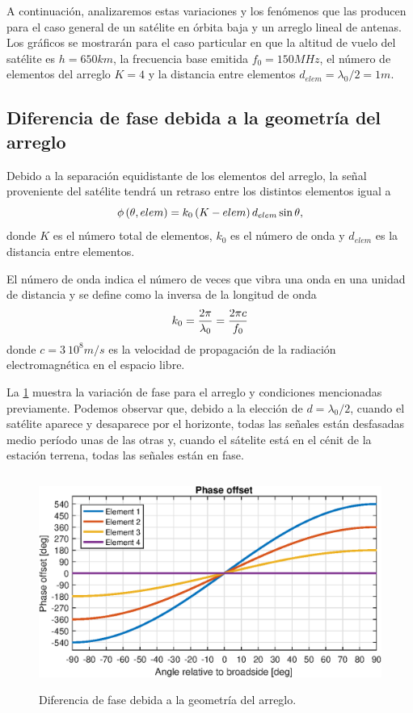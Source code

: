 \documentclass{article}
\newenvironment{standalone}{\begin{preview}}{\end{preview}}
\begin{document}
\begin{standalone}
  A continuación, analizaremos estas variaciones y los fenómenos que las producen para el caso general de un satélite en órbita baja y un arreglo lineal de antenas. Los gráficos se mostrarán para el caso particular en que la altitud de vuelo del satélite es $h = 650km$, la frecuencia base emitida $f_0 = 150MHz$, el número de elementos del arreglo $K = 4$ y la distancia entre elementos $d_{elem} = \lambda_0 / 2 = 1 m$.

  \subsection{Diferencia de fase debida a la geometría del arreglo}

  Debido a la separación equidistante de los elementos del arreglo, la señal proveniente del satélite tendrá un retraso entre los distintos elementos igual a \cite[126]{visser2005}
  \begin{equation}
    \phi \left( \theta, elem \right) = k_0 \left( K - elem \right) d_{elem} \sin{\theta},
    \tagaddtext{[\si{\radian}]}
  \end{equation}
  donde $K$ es el número total de elementos, $k_0$ es el número de onda y $d_{elem}$ es la distancia entre elementos.

  El número de onda indica el número de veces que vibra una onda en una unidad de distancia y se define como la inversa de la longitud de onda
  \begin{equation}
    k_0 = \frac{2\pi}{\lambda_{0}} = \frac{2\pi c}{f_0}
    \tagaddtext{[\si{\radian\per\meter}]}
  \end{equation}
  donde $c = 3 \ 10^8 m/s$ es la velocidad de propagación de la radiación electromagnética en el espacio libre.

  La \cref{fig:phase-offset} muestra la variación de fase para el arreglo y condiciones mencionadas previamente. Podemos observar que, debido a la elección de $d = \lambda_0 / 2$, cuando el satélite aparece y desaparece por el horizonte, todas las señales están desfasadas medio período unas de las otras y, cuando el sátelite está en el cénit de la estación terrena, todas las señales están en fase.

  \begin{figure}[!htbp]
    \centering
    \includegraphics[width=\linewidth, height=70mm, keepaspectratio]{../images/phase-offset.eps}
    \caption{Diferencia de fase debida a la geometría del arreglo.}
    \label{fig:phase-offset}
  \end{figure}


\end{standalone}
\end{document}
